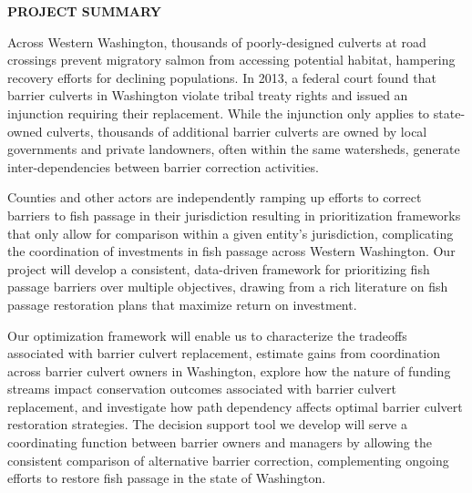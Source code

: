 \begin{center} \textbf{PROJECT SUMMARY} \end{center}




			Across Western Washington, thousands of poorly-designed culverts at road crossings prevent migratory salmon from accessing potential habitat, hampering recovery efforts for declining populations. In 2013, a federal court found that barrier culverts in Washington violate tribal treaty rights and issued an injunction requiring their replacement. While the injunction only applies to state-owned culverts, thousands of additional barrier culverts are owned by local governments and private landowners, often within the same watersheds, generate inter-dependencies between barrier correction activities. 
			
			Counties and other actors are independently ramping up efforts to correct barriers to fish passage in their jurisdiction resulting in prioritization frameworks that only allow for comparison within a given entity's jurisdiction, complicating the coordination of investments in fish passage across Western Washington. Our project will develop a consistent, data-driven framework for prioritizing fish passage barriers over multiple objectives, drawing from a rich literature on fish passage restoration plans that maximize return on investment. 
			
			Our optimization framework will enable us to characterize the tradeoffs associated with barrier culvert replacement, estimate gains from coordination across barrier culvert owners in Washington, explore how the nature of funding streams impact conservation outcomes associated with barrier culvert replacement, and investigate how path dependency affects optimal barrier culvert restoration strategies. The decision support tool we develop will serve a coordinating function between barrier owners and managers by allowing the consistent comparison of alternative barrier correction, complementing ongoing efforts to restore fish passage in the state of Washington.

